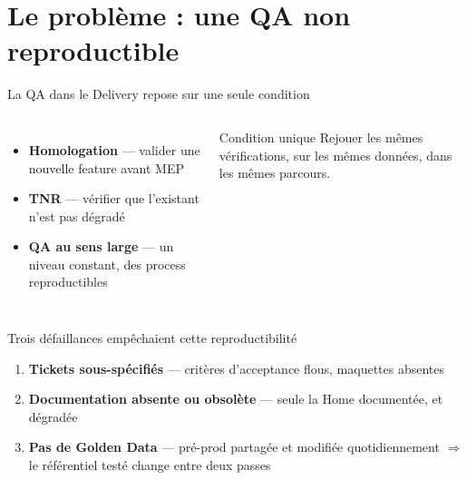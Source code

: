 \section{Le problème : une QA non reproductible}

\begin{frame}{La QA dans le Delivery repose sur une seule condition}
  \begin{columns}[T]
    \begin{itemize}
      \item \textbf{Homologation} --- valider une nouvelle feature avant MEP
      \item \textbf{TNR} --- vérifier que l'existant n'est pas dégradé
      \item \textbf{QA au sens large} --- un niveau constant, des process reproductibles
    \end{itemize}
    \begin{block}{Condition unique}
      Rejouer \alert{les mêmes vérifications}, sur \alert{les mêmes données}, dans \alert{les mêmes parcours}.
    \end{block}
  \end{columns}
\end{frame}

\begin{frame}{Trois défaillances empêchaient cette reproductibilité}
  \begin{enumerate}
    \item \textbf{Tickets sous-spécifiés} --- critères d'acceptance flous, maquettes absentes
    \item \textbf{Documentation absente ou obsolète} --- seule la Home documentée, et dégradée
    \item \textbf{Pas de Golden Data} --- pré-prod partagée et modifiée quotidiennement $\Rightarrow$
          le référentiel testé change entre deux passes
  \end{enumerate}
  \vskip 6pt
\end{frame}

